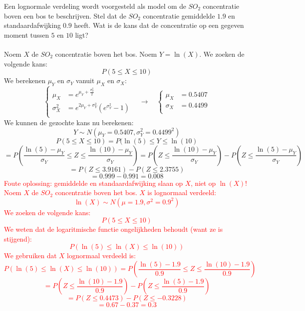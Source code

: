 \documentclass[main.tex]{subfiles}
\begin{document}
\begin{oef}
  Een lognormale verdeling wordt voorgesteld als model om de $SO_{2}$ concentratie boven een bos te beschrijven.
  Stel dat de $SO_{2}$ concentratie gemiddelde $1.9$ en standaardafwijking $0.9$ heeft.
  Wat is de kans dat de concentratie op een gegeven moment tussen $5$ en $10$ ligt?\\\\
  Noem $X$ de $SO_{2}$ concentratie boven het bos.
  Noem $Y=\ln(X)$.
  We zoeken de volgende kans:
  \[ P( 5 \le X \le 10) \]
  We berekenen $\mu_{Y}$ en $\sigma_{Y}$ vanuit $\mu_{X}$ en $\sigma_{X}$:\\
  \[
  \left\{
    \begin{array}{rl}
      \mu_{X} &= e^{\mu_{Y} + \frac{\sigma_{Y}^{2}}{2}}\\
      \sigma_{X}^{2} &= e^{2\mu_{Y} + \sigma_{Y}^{2}}\left(e^{\sigma_{Y}^{2}}-1\right)\\
    \end{array}
  \right.
  \quad\longrightarrow\quad
  \left\{
    \begin{array}{rl}
      \mu_{X} &= 0.5407\\
      \sigma_{X} &= 0.4499\\
    \end{array}
  \right.
  \]
  We kunnen de gezochte kans nu berekenen:
  \[ Y \sim N(\mu_{Y}=0.5407,\sigma_{Y}^{2}=0.4499^{2}) \]
  \[ P( 5 \le X \le 10) = P(\ln(5) \le Y \le \ln(10) \]
  \[ = P\left( \frac{\ln(5)-\mu_{Y}}{\sigma_{Y}}  \le Z \le \frac{\ln(10)-\mu_{Y}}{\sigma_{Y}}\right) = P\left( Z \le \frac{\ln(10)-\mu_{Y}}{\sigma_{Y}}\right) - P\left(Z \le \frac{\ln(5)-\mu_{Y}}{\sigma_{Y}}\right) \]
  \[ = P( Z \le 3.9161) - P(Z \le 2.3755) \]
  \[ = 0.999 - 0.991 = 0.008 \]
  \textcolor{red}{Foute oplossing: gemiddelde en standaardafwijking slaan op $X$, niet op $\ln(X)$!\\
  Noem $X$ de $SO_{2}$ concentratie boven het bos.
  $X$ is lognormaal verdeeld:
  \[ \ln(X) \sim N(\mu=1.9,\sigma^{2}=0.9^{2}) \]
  We zoeken de volgende kans:
  \[ P( 5 \le X \le 10) \]
  We weten dat de logaritmische functie ongelijkheden behoudt (want ze is stijgend):
  \[ P\left( \ln(5) \le \ln(X) \le \ln(10)\right) \]
  We gebruiken dat $X$ lognormaal verdeeld is:
  \[ P\left( \ln(5) \le \ln(X) \le \ln(10)\right) = P\left( \frac{\ln(5) - 1.9}{0.9} \le Z \le \frac{\ln(10) - 1.9}{0.9} \right)\]
  \[ 
  = P\left(Z \le \frac{\ln(10) - 1.9}{0.9}\right) - P\left( Z \le \frac{\ln(5) - 1.9}{0.9} \right)
  \]
  \[ 
  = P\left(Z \le 0.4473 \right) - P\left( Z \le -0.3228 \right)
  \]
  \[ 
  = 0.67 - 0.37 = 0.3
  \]
  }
\end{oef}
\end{document}
